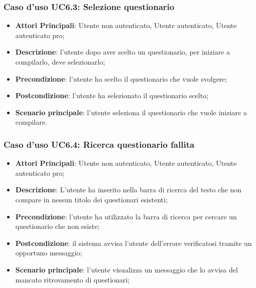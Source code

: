 \subsubsection{Caso d'uso UC6.3: Selezione questionario}
\begin{itemize}
\item\textbf{Attori Principali}: Utente non autenticato, Utente autenticato, Utente autenticato pro;
\item\textbf{Descrizione}: l'utente dopo aver scelto un questionario, per iniziare a compilarlo, deve selezionarlo;
\item\textbf{Precondizione}: l'utente ha scelto il questionario che vuole svolgere;
\item\textbf{Postcondizione}: l'utente ha selezionato il questionario scelto;
\item\textbf{Scenario principale}: l'utente seleziona il questionario che vuole iniziare a compilare.
\end{itemize}

\subsubsection{Caso d'uso UC6.4: Ricerca questionario fallita}
\begin{itemize}
\item\textbf{Attori Principali}: Utente non autenticato, Utente autenticato, Utente autenticato pro;
\item\textbf{Descrizione}: L'utente ha inserito nella barra di ricerca del testo che non compare in nessun titolo dei questionari esistenti;
\item\textbf{Precondizione}: l'utente ha utilizzato la barra di ricerca per cercare un questionario che non esiste;
\item\textbf{Postcondizione}: il sistema avvisa l'utente dell'errore verificatosi tramite un opportuno messaggio;
\item\textbf{Scenario principale}: l'utente visualizza un messaggio che lo avvisa del mancato ritrovamento di questionari;
\end{itemize}